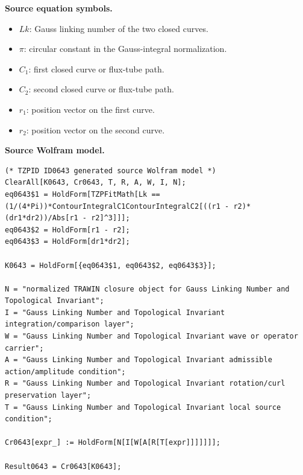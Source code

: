 \begin{minipage}[t]{0.49\linewidth}
\begingroup
\small
\raggedright
\textbf{Source equation symbols.}\par
\begin{itemize}[leftmargin=1.35em,itemsep=1pt,topsep=1pt,parsep=0pt]
    \item $Lk$: Gauss linking number of the two closed curves.
    \item $\pi$: circular constant in the Gauss-integral normalization.
    \item $C_1$: first closed curve or flux-tube path.
    \item $C_2$: second closed curve or flux-tube path.
    \item $r_1$: position vector on the first curve.
    \item $r_2$: position vector on the second curve.
\end{itemize}
\endgroup
\end{minipage}\hfill
\begin{minipage}[t]{0.47\linewidth}
\begingroup
\scriptsize
\raggedright
\textbf{Source Wolfram model.}\par
\begin{Verbatim}[fontsize=\tiny,breaklines=true,breakanywhere=true]
(* TZPID ID0643 generated source Wolfram model *)
ClearAll[K0643, Cr0643, T, R, A, W, I, N];
eq0643$1 = HoldForm[TZPFitMath[Lk == (1/(4*Pi))*ContourIntegralC1ContourIntegralC2[((r1 - r2)*(dr1*dr2))/Abs[r1 - r2]^3]]];
eq0643$2 = HoldForm[r1 - r2];
eq0643$3 = HoldForm[dr1*dr2];

K0643 = HoldForm[{eq0643$1, eq0643$2, eq0643$3}];

N = "normalized TRAWIN closure object for Gauss Linking Number and Topological Invariant";
I = "Gauss Linking Number and Topological Invariant integration/comparison layer";
W = "Gauss Linking Number and Topological Invariant wave or operator carrier";
A = "Gauss Linking Number and Topological Invariant admissible action/amplitude condition";
R = "Gauss Linking Number and Topological Invariant rotation/curl preservation layer";
T = "Gauss Linking Number and Topological Invariant local source condition";

Cr0643[expr_] := HoldForm[N[I[W[A[R[T[expr]]]]]]];

Result0643 = Cr0643[K0643];
\end{Verbatim}
\endgroup
\end{minipage}


